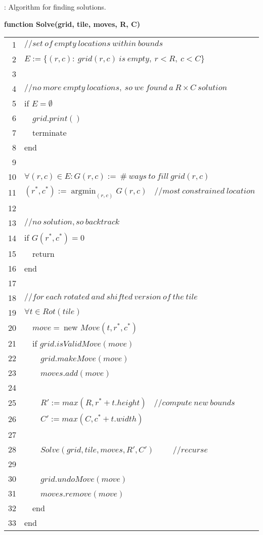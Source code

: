 \documentclass[10pt,a4paper]{article}
\DeclareMathOperator*{\argmin}{\mathop{\mathrm{argmin}}}
\theoremstyle{definition}
\begin{document}
\begin{algorithm}[!htpb]
\renewcommand{\arraystretch}{1.15}
\caption{: Algorithm for finding solutions.}
\vspace{0.5ex}
\bf function Solve(grid, tile, moves, R, C) \\
\begin{tabular}{rl}
\\
1 & $//set~of~empty~locations~within~bounds$ \\
2 & $E:=\{(r,c):~grid(r,c)~is~empty,~r<R,~c<C\}$ \\
3 & \\
4 & $//no~more~empty~locations,~so~we~found~a~R \times C~solution$ \\
5 & if $E=\emptyset$\\
6 & ~~$grid.print()$ \\
7 & ~~terminate \\
8 & end \\
9 & \\
10 & $\forall (r,c) \in E: G(r,c):=~\#~ways~to~fill~grid(r,c)$ \\
11 & $(r^*,c^*):=\argmin_{(r,c)} G(r,c)~~~~//most~constrained~location$ \\
12 & \\
13 & $//no~solution, so~backtrack$ \\
14 & if $G(r^*,c^*)=0$ \\
15 & ~~return \\
16 & end \\
17 & \\
18 & $//for~each~rotated~and~shifted~version~of~the~tile$ \\
19 & $\forall t \in Rot(tile)$ \\
20 & ~~$move=~$new $Move(t,r^*,c^*)$ \\
21 & ~~if $grid.isValidMove(move)$ \\
22 & ~~~~$grid.makeMove(move)$ \\
23 & ~~~~$moves.add(move)$ \\
24 & \\
25 & ~~~~$R':=max(R,r^*+t.height)~~~~//compute~new~bounds$\\
26 & ~~~~$C':=max(C,c^*+t.width)$\\
27 & \\
28 & ~~~~$Solve(grid,tile,moves,R',C')$ ~~~~$//recurse$\\
29 & \\
30 & ~~~~$grid.undoMove(move)$ \\
31 & ~~~~$moves.remove(move)$ \\
32 & ~~end \\
33 & end \\
\end{tabular}
\label{alg:solver}
\end{algorithm}
\end{document}
